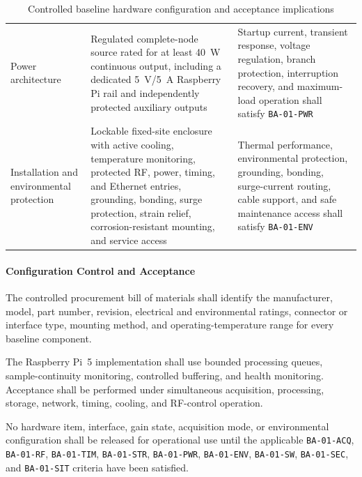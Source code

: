 \documentclass[11pt,a4paper]{article}
\begin{document}
\begin{table}[htbp]
\begin{tabularx}{\columnwidth}{
				>{\raggedright\arraybackslash}p{2.8cm}
				>{\raggedright\arraybackslash}p{4.1cm}
				>{\raggedright\arraybackslash}X}
			Power architecture &
			Regulated complete-node source rated for at least 40~W continuous
			output, including a dedicated 5~V/5~A Raspberry Pi rail and
			independently protected auxiliary outputs &
			Startup current, transient response, voltage regulation, branch
			protection, interruption recovery, and maximum-load operation shall
			satisfy \texttt{BA-01-PWR} \\
			
			Installation and environmental protection &
			Lockable fixed-site enclosure with active cooling, temperature
			monitoring, protected RF, power, timing, and Ethernet entries,
			grounding, bonding, surge protection, strain relief,
			corrosion-resistant mounting, and service access &
			Thermal performance, environmental protection, grounding, bonding,
			surge-current routing, cable support, and safe maintenance access
			shall satisfy \texttt{BA-01-ENV} \\
			
			\bottomrule
		\end{tabularx}
		\caption{Controlled baseline hardware configuration and acceptance
			implications}
		\label{tab:selected-hardware}
		
	\end{table}
	
	\paragraph*{Configuration Control and Acceptance}
	
	The controlled procurement bill of materials shall identify the manufacturer,
	model, part number, revision, electrical and environmental ratings, connector
	or interface type, mounting method, and operating-temperature range for every
	baseline component.
	
	The Raspberry Pi~5 implementation shall use bounded processing queues,
	sample-continuity monitoring, controlled buffering, and health monitoring.
	Acceptance shall be performed under simultaneous acquisition, processing,
	storage, network, timing, cooling, and RF-control operation.
	
	No hardware item, interface, gain state, acquisition mode, or environmental
	configuration shall be released for operational use until the applicable
	\texttt{BA-01-ACQ}, \texttt{BA-01-RF}, \texttt{BA-01-TIM},
	\texttt{BA-01-STR}, \texttt{BA-01-PWR}, \texttt{BA-01-ENV},
	\texttt{BA-01-SW}, \texttt{BA-01-SEC}, and \texttt{BA-01-SIT} criteria have
	been satisfied.
	
\end{document}
